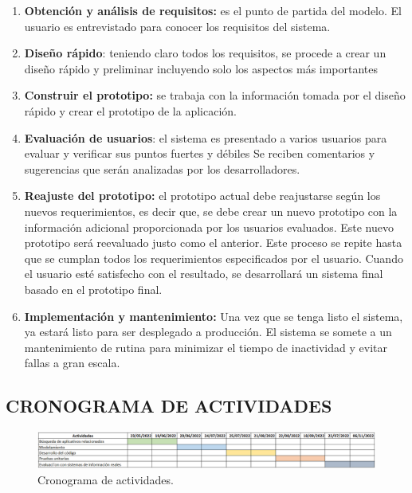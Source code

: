 \documentclass[12pt,a4paper,final, xcolor=table, table]{article}
\begin{document}
	\begin{enumerate}
		\item \textbf{Obtención y análisis de requisitos:} es el punto de partida del modelo. El usuario es entrevistado para conocer los requisitos del sistema.
		
		\item \textbf{Diseño rápido}: teniendo claro todos los requisitos, se procede a crear un diseño rápido y preliminar incluyendo solo los aspectos más importantes 
		
		\item\textbf{ Construir el prototipo:} se trabaja con la información tomada por el diseño rápido y crear el prototipo de la aplicación.
		
		\item \textbf{Evaluación de usuarios}: el sistema es presentado a varios usuarios para evaluar y verificar sus puntos fuertes y débiles Se reciben comentarios y sugerencias que serán analizadas por los desarrolladores.
		
		\item \textbf{Reajuste del prototipo:} el prototipo actual debe reajustarse según los nuevos requerimientos, es decir que, se debe crear un nuevo prototipo con la información adicional proporcionada por los usuarios evaluados. Este nuevo prototipo será reevaluado justo como el anterior. Este proceso se repite hasta que se cumplan todos los requerimientos especificados por el usuario. Cuando el usuario esté satisfecho con el resultado, se desarrollará un sistema final basado en el prototipo final. 
		
		\item \textbf{Implementación y mantenimiento:} Una vez que se tenga listo el sistema, ya estará listo para ser desplegado a producción. El sistema se somete a un mantenimiento de rutina para minimizar el tiempo de inactividad y evitar fallas a gran escala.
		
	\end{enumerate}
	
	\newpage
	
	\begin{landscape}
	
	\section{CRONOGRAMA DE ACTIVIDADES}
	\begin{figure}[h!]
		\centering
		\includegraphics[width=\linewidth]{images/cronograma.png}
		\caption{Cronograma de actividades.}
		\label{fig:usecaseEasyIoT}
	\end{figure}
	
	\end{landscape}
	
\end{document}
